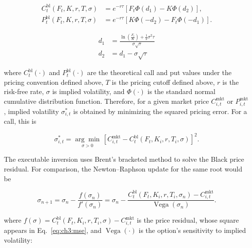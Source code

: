 \begin{equation}\label{eq:ch3:black76}
    \begin{aligned}
        C_t^{\mathrm{bl}}(F_t,K,r,T,\sigma)
        &=e^{-r\tau}
          \left[F_t\Phi(d_1)-K\Phi(d_2)\right],\\
        P_t^{\mathrm{bl}}(F_t,K,r,T,\sigma)
        &=e^{-r\tau}
          \left[K\Phi(-d_2)-F_t\Phi(-d_1)\right].
    \end{aligned}
\end{equation}

\begin{equation*}
    \begin{split}
        d_1 &= \frac{\ln\left( \frac{F_t}{K} \right) + \frac{1}{2}\sigma^2\tau}{\sigma \sqrt{\tau}} \\
        d_2 &= d_1 - \sigma \sqrt{\tau}
    \end{split}
\end{equation*}


where \(C_t^{\mathrm{bl}}(\cdot)\) and \(P_t^{\mathrm{bl}}(\cdot)\) are the
theoretical call and put values under the pricing convention defined above, \(T\) is the pricing cutoff defined above, \(r\) is the
risk-free rate, \(\sigma\) is implied volatility, and \(\Phi(\cdot)\) is the
standard normal cumulative distribution function. Therefore, for a given
market price \(C_{i,t}^{\mathrm{mkt}}\) or \(P_{i,t}^{\mathrm{mkt}}\), implied
volatility \(\sigma_{i,t}^{*}\) is obtained by minimizing the squared pricing
error. For a call, this is

\begin{equation}\label{eq:ch3:mse}
    \sigma_{i,t}^{*}
    =
    \underset{\sigma>0}{\arg\min}\,
    \left[
    C_{i,t}^{\mathrm{mkt}}
    -
    C_t^{\mathrm{bl}}(F_t,K_i,r,T_i,\sigma)
    \right]^2 .
\end{equation}


The executable inversion uses Brent's bracketed method to solve the Black price residual. For comparison, the Newton--Raphson update for the same root would be

\begin{equation}\label{eq:ch3:newton}
    \sigma_{n+1}
    =
    \sigma_n-\frac{f(\sigma_n)}{f'(\sigma_n)}
    =
    \sigma_n
    -
    \frac{
    C_t^{\mathrm{bl}}(F_t,K_i,r,T_i,\sigma_n)
    -
    C_{i,t}^{\mathrm{mkt}}
    }{
    \operatorname{Vega}(\sigma_n)
    } .
\end{equation}

where \(f(\sigma)=C_t^{\mathrm{bl}}(F_t,K_i,r,T_i,\sigma)
-C_{i,t}^{\mathrm{mkt}}\) is the price residual, whose square appears in Eq.~\eqref{eq:ch3:mse}, and \(\operatorname{Vega}(\cdot)\) is the option's sensitivity to implied volatility:


